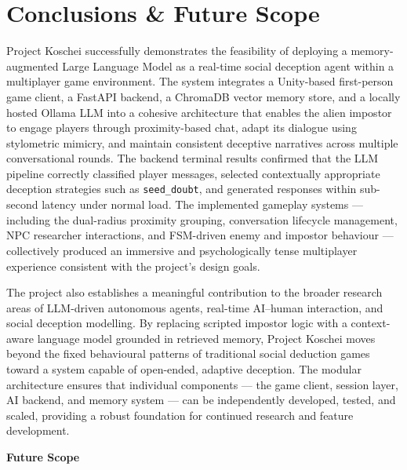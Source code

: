 \chapter{Conclusions \& Future Scope}

Project Koschei successfully demonstrates the feasibility of deploying a memory-augmented Large Language Model as a real-time social deception agent within a multiplayer game environment. The system integrates a Unity-based first-person game client, a FastAPI backend, a ChromaDB vector memory store, and a locally hosted Ollama LLM into a cohesive architecture that enables the alien impostor to engage players through proximity-based chat, adapt its dialogue using stylometric mimicry, and maintain consistent deceptive narratives across multiple conversational rounds. The backend terminal results confirmed that the LLM pipeline correctly classified player messages, selected contextually appropriate deception strategies such as \texttt{seed\_doubt}, and generated responses within sub-second latency under normal load. The implemented gameplay systems --- including the dual-radius proximity grouping, conversation lifecycle management, NPC researcher interactions, and FSM-driven enemy and impostor behaviour --- collectively produced an immersive and psychologically tense multiplayer experience consistent with the project's design goals.

The project also establishes a meaningful contribution to the broader research areas of LLM-driven autonomous agents, real-time AI--human interaction, and social deception modelling. By replacing scripted impostor logic with a context-aware language model grounded in retrieved memory, Project Koschei moves beyond the fixed behavioural patterns of traditional social deduction games toward a system capable of open-ended, adaptive deception. The modular architecture ensures that individual components --- the game client, session layer, AI backend, and memory system --- can be independently developed, tested, and scaled, providing a robust foundation for continued research and feature development.

\vspace{9mm}
\noindent\textbf{\large Future Scope}
\vspace{3mm}

